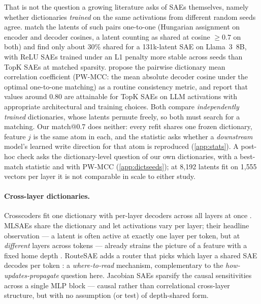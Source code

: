 That is not the question a growing literature asks of SAEs themselves, namely
whether dictionaries \emph{trained} on the same activations from different
random seeds agree. \citet{paulo2026seeds} match the latents of such pairs
one-to-one (Hungarian assignment on encoder and decoder cosines, a latent
counting as shared at cosine $\ge 0.7$ on both) and find only about 30\%
shared for a 131k-latent SAE on Llama~3~8B, with ReLU SAEs trained under an
L1 penalty more stable across seeds than TopK SAEs at matched sparsity.
\citet{song2026consistency} propose the pairwise dictionary mean correlation
coefficient (PW-MCC: the mean absolute decoder cosine under the optimal
one-to-one matching) as a routine consistency metric, and report that values
around 0.80 are attainable for TopK SAEs on LLM activations with appropriate
architectural and training choices. Both compare \emph{independently trained}
dictionaries, whose latents permute freely, so both must search for a
matching. Our match@0.7 does neither: every refit shares one frozen
dictionary, feature $j$ is the same atom in each, and the statistic asks
whether a \emph{downstream} model's learned write direction for that atom is
reproduced (\cref{app:stats}). A post-hoc check asks the dictionary-level
question of our own dictionaries, with a best-match statistic and with
PW-MCC (\cref{app:dictseeds}); at 8{,}192 latents fit on 1{,}555 vectors per
layer it is not comparable in scale to either study.

\paragraph{Cross-layer dictionaries.}
Crosscoders fit one dictionary with per-layer decoders across all layers at
once \citep{lindsey2024crosscoders}. MLSAEs share the dictionary and let
activations vary per layer; their headline observation --- a latent is often
active at exactly one layer per token, but at \emph{different} layers across
tokens --- already strains the picture of a feature with a fixed home depth
\citep{lawson2025mlsae}. RouteSAE adds a router that picks which layer a
shared SAE decodes per token \citep{shi2025route}: a \emph{where-to-read}
mechanism, complementary to the \emph{how-updates-propagate} question here.
Jacobian SAEs sparsify the causal sensitivities across a single MLP block
\citep{farnik2025jacobian} --- causal rather than correlational cross-layer
structure, but with no assumption (or test) of depth-shared form.

